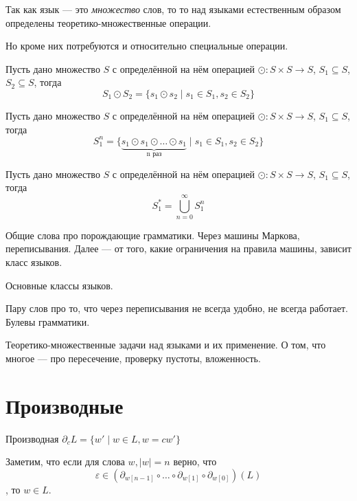 Так как язык --- это \textit{множество} слов, то то над языками естественным образом определены теоретико-множественные операции.


Но кроме них потребуются и относительно специальные операции.

Пусть дано множество $S$ с определённой на нём операцией $\odot: S \times S \to S$, $S_1 \subseteq S$, $S_2 \subseteq S$, тогда 
$$
S_1 \odot S_2 = \{ s_1 \odot s_2 \mid s_1 \in S_1, s_2 \in S_2\}
$$

Пусть дано множество $S$ с определённой на нём операцией $\odot: S \times S \to S$, $S_1 \subseteq S$, тогда 
$$
S_1 ^ n = \{ \underbrace{s_1 \odot s_1 \odot \ldots \odot s_1}_{\text{n раз}} \mid s_1 \in S_1, s_2 \in S_2\}
$$


Пусть дано множество $S$ с определённой на нём операцией $\odot: S \times S \to S$, $S_1 \subseteq S$, тогда 
$$
S_1 ^ * = \bigcup_{n = 0}^{\infty} S_1^n
$$



Общие слова про порождающие грамматики. Через машины Маркова, переписывания. Далее --- от того, какие ограничения на правила машины, зависит класс языков.

Основные классы языков. 

Пару слов про то, что через переписывания не всегда удобно, не всегда работает. Булевы грамматики.

Теоретико-множественные задачи над языками и их применение.
О том, что многое --- про пересечение, проверку пустоты, вложенность.

\section{Производные}

\begin{definition}
  Производная $\partial_c L = \{ w' \mid w \in L, w = cw'\}$
\end{definition}

Заметим, что если для слова $w, |w|=n$ верно, что $$\varepsilon \in (\partial_{w[n-1]} \circ \ldots \circ \partial_{w[1]}  \circ \partial_{w[0]}) (L)$$, то $w \in L$.



